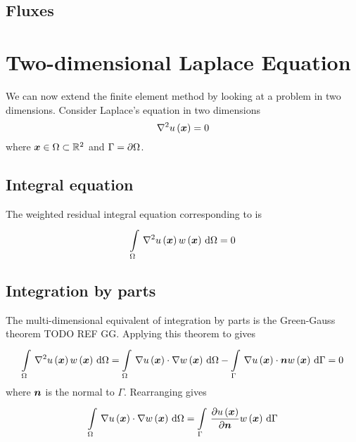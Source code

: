 \subsection{Fluxes}
\label{subsec:Fluxes}

\section{Two-dimensional Laplace Equation}
\label{sec:FEMTwoDLaplaceEquation}

We can now extend the finite element method by looking at a problem in two dimensions. Consider Laplace's equation in two dimensions
\begin{equation}
  \laplacian{}{\fnof{u}{\vectr{x}}}=0
  \label{eqn:FEMTwoDLaplaceEquation}
\end{equation}
where $\vectr{x}\in\Omega\subset\rntopology{2}$ and $\Gamma= \partial{\Omega} $.

\subsection{Integral equation}
\label{subsec:FEMTwoDLaplaceIntegralEquation}

The weighted residual integral equation corresponding to  is
\begin{equation}
  \gint{\Omega}{}{\laplacian{}{\fnof{u}{\vectr{x}}}\fnof{w}{\vectr{x}}}{\Omega}=0
  \label{eqn:FEMTwoDLaplaceWeightedResidual}
\end{equation}

\subsection{Integration by parts}
\label{subsec:FEMTwoDLaplaceIntegrationByParts}

The multi-dimensional equivalent of integration by parts is the Green-Gauss theorem TODO REF GG. Applying this theorem to  gives
\begin{equation}
  \gint{\Omega}{}{\laplacian{}{\fnof{u}{\vectr{x}}}\fnof{w}{\vectr{x}}}{\Omega}=
    \gint{\Omega}{}{\dotprod{\gradient{}{\fnof{u}{\vectr{x}}}}{\gradient{}{\fnof{w}{\vectr{x}}}}}{\Omega}-
    \gint{\Gamma}{}{\dotprod{\gradient{}{\fnof{u}{\vectr{x}}}}{\vectr{n}}\fnof{w}{\vectr{x}}}{\Gamma}=0
\end{equation}
where $ \boldsymbol{n} $ is the normal to $\Gamma$. Rearranging gives
\begin{equation}
  \gint{\Omega}{}{\dotprod{\gradient{}{\fnof{u}{\vectr{x}}}}{\gradient{}{\fnof{w}{\vectr{x}}}}}{\Omega}=
  \gint{\Gamma}{}{\delby{\fnof{u}{\vectr{x}}}{\vectr{n}}\fnof{w}{\vectr{x}}}{\Gamma}
  \label{eqn:FEMTwoDLaplaceStartingIntegralEquation}
\end{equation}


